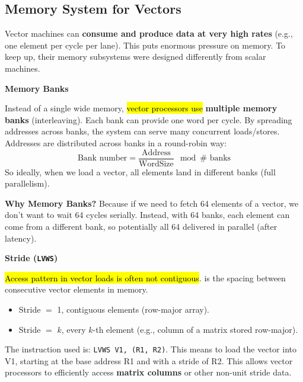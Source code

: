 \subsection{Memory System for Vectors}

Vector machines can \textbf{consume and produce data at very high rates} (e.g., one element per cycle per lane). This puts enormous pressure on memory. To keep up, their memory subsystems were designed differently from scalar machines.

\highspace
\begin{flushleft}
    \textcolor{Green3}{ \textbf{Memory Banks}}
\end{flushleft}
Instead of a single wide memory, \hl{vector processors use} \textbf{multiple memory banks} (interleaving). Each bank can provide one word per cycle. By spreading addresses across banks, the system can serve many concurrent loads/stores. Addresses are distributed across banks in a round-robin way:
\begin{equation}
    \text{Bank number} = \dfrac{\text{Address}}{\text{WordSize}} \mod \#\text{ banks}
\end{equation}
So ideally, when we load a vector, all elements land in different banks (full parallelism).

\highspace
\textcolor{Green3}{ \textbf{Why Memory Banks?}} Because if we need to fetch 64 elements of a vector, we don't want to wait 64 cycles serially. Instead, with 64 banks, each element can come from a different bank, so potentially all 64 delivered in parallel (after latency).

\highspace
\begin{flushleft}
    \textcolor{Green3}{ \textbf{Stride (\texttt{LVWS})}}
\end{flushleft}
\hl{Access pattern in vector loads is often not contiguous}.  is the spacing between consecutive vector elements in memory.
\begin{itemize}
    \item Stride $=$ 1, contiguous elements (row-major array).
    \item Stride $=$ $k$, every $k$-th element (e.g., column of a matrix stored row-major).
\end{itemize}
The instruction used is: \texttt{LVWS V1, (R1, R2)}. This means to load the vector into V1, starting at the base address R1 and with a stride of R2. This allows vector processors to efficiently access \textbf{matrix columns} or other non-unit stride data.

